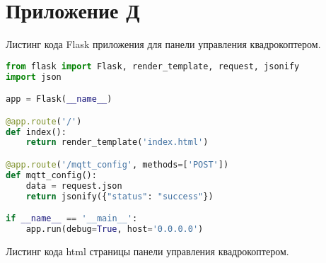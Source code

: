 \chapter{Приложение Д}

Листинг кода Flask приложения для панели управления квадрокоптером.

\begin{lstlisting}[language=Python]
from flask import Flask, render_template, request, jsonify
import json

app = Flask(__name__)

@app.route('/')
def index():
    return render_template('index.html')

@app.route('/mqtt_config', methods=['POST'])
def mqtt_config():
    data = request.json
    return jsonify({"status": "success"})

if __name__ == '__main__':
    app.run(debug=True, host='0.0.0.0')
\end{lstlisting}


Листинг кода html страницы панели управления квадрокоптером.


